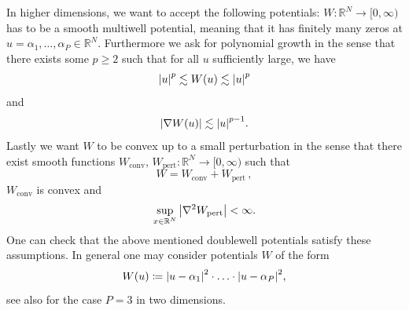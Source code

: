 In higher dimensions, we want to accept the following potentials: $ W \colon 
\mathbb{ R }^{ N } \to [0, \infty ) $ has to be a smooth multiwell potential, 
meaning that it has finitely many zeros at $ u = \alpha_{ 1 }, \dotsc , 
\alpha_{ P } \in \mathbb{ R }^{ N } $. Furthermore we ask for polynomial growth 
in the sense that there exists some $ p \geq 2 $ such that for all $ u $ 
sufficiently large, we have
\begin{equation}
	\label{polynomial_growth}
	\abs{ u }^{ p } \lesssim W(u) \lesssim \abs{ u }^{ p }
\end{equation}
and
\begin{equation}
	\label{polynomial_growth_derivative}
	\abs{ \nabla W ( u ) } \lesssim \abs{ u }^{ p -1 }.
\end{equation}
Lastly we want $ W $ to be convex up to a small perturbation in the sense that 
there exist smooth functions 
$ W_{ \mathrm{conv} }$, $ W_{ \mathrm{pert} } \colon \mathbb{ R }^{ N } \to [ 0 , \infty ) $ such that
\begin{equation}
	\label{decomposition_of_w}
	W = W_{ \mathrm{conv}} + W_{ \mathrm{pert}}\, ,
\end{equation}
$ W_{ \mathrm{conv} } $ is convex and
\begin{equation}
	\label{perturbation bound}
	\sup_{ x \in \mathbb{ R }^{ N } }
	\abs{ \nabla^{ 2 } W_{ \mathrm{pert} } } < \infty.
\end{equation}
One can check that the above mentioned doublewell potentials satisfy these 
assumptions. In general one may consider potentials $ W $ of the form
\begin{equation*}
	W ( u ) \coloneqq
	\abs{ u - \alpha_{ 1 } }^{ 2 } 
	\cdot
	\dotsc
	\cdot
	\abs{ u - \alpha_{ P } }^{ 2 },
\end{equation*}
see also  for the case $ P = 3 $ in two 
dimensions.
